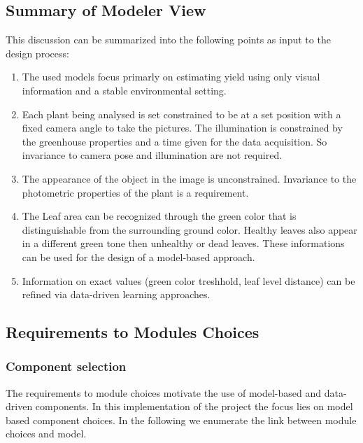 \graphicspath{{members/paz/figures}}

\subsection{Summary of Modeler View}\label{subsec:summary-of-modeler-view}


This discussion can be summarized into the following points as input to the
design process:

\begin{enumerate}
    \item The used models focus primarly on estimating yield using only visual information and a stable environmental setting.
    
    \item Each plant being analysed is set constrained to be at a set position with a fixed camera angle to take the pictures. The illumination is constrained by the greenhouse properties and a time given for the data acquisition. So invariance to camera pose and illumination are not required.
    
    \item The appearance of the object in the image is unconstrained. Invariance to the photometric properties of the plant is a requirement.
    
    \item The Leaf area can be recognized through the green color that is distinguishable from the surrounding ground color. Healthy leaves also appear in a  different green tone then unhealthy or dead leaves. These informations can be used for the design of a model-based approach.
    
    \item Information on exact values (green color treshhold, leaf level distance) can be refined via data-driven learning approaches.
    
\end{enumerate}

\subsection{Requirements to Modules Choices}


\subsubsection*{Component selection}

The requirements to module choices motivate the use of model-based and data-driven components. In this implementation of the project the focus lies on model based component choices. In the following we enumerate the link between module choices and model.


